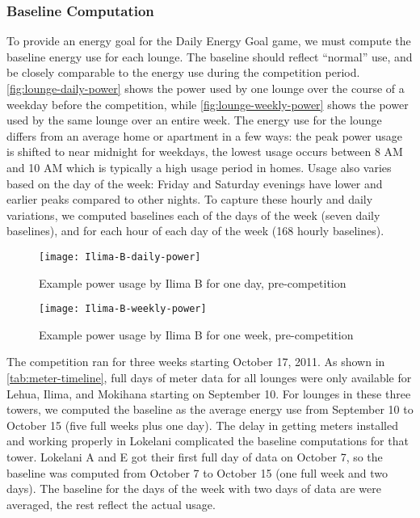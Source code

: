 \subsubsection{Baseline Computation}
\label{sec:baseline-computation}

To provide an energy goal for the Daily Energy Goal game, we must compute the  baseline energy use for each lounge. The baseline should reflect ``normal'' use, and be closely comparable to the energy use during the competition period. \autoref{fig:lounge-daily-power} shows the power used by one lounge over the course of a weekday before the competition, while \autoref{fig:lounge-weekly-power} shows the power used by the same lounge over an entire week. The energy use for the lounge differs from an average home or apartment in a few ways: the peak power usage is shifted to near midnight for weekdays, the lowest usage occurs between 8 AM and 10 AM which is typically a high usage period in homes. Usage also varies based on the day of the week: Friday and Saturday evenings have lower and earlier peaks compared to other nights. To capture these hourly and daily variations, we computed baselines each of the days of the week (seven daily baselines), and for each hour of each day of the week (168 hourly baselines).

\begin{figure}[htbp]
	\centering
		\texttt{[image: Ilima-B-daily-power]}
		\caption{Example power usage by Ilima B for one day, pre-competition}
\label{fig:lounge-daily-power}
\end{figure}

\begin{figure}[htbp]
	\centering
		\texttt{[image: Ilima-B-weekly-power]}
		\caption{Example power usage by Ilima B for one week, pre-competition}
\label{fig:lounge-weekly-power}
\end{figure}

The competition ran for three weeks starting October 17, 2011. As shown in \autoref{tab:meter-timeline}, full days of meter data for all lounges were only available for Lehua, Ilima, and Mokihana starting on September 10. For lounges in these three towers, we computed the baseline as the average energy use from September 10 to October 15 (five full weeks plus one day). The delay in getting meters installed and working properly in Lokelani complicated the baseline computations for that tower. Lokelani A and E got their first full day of data on October 7, so the baseline was computed from October 7 to October 15 (one full week and two days). The baseline for the days of the week with two days of data are were averaged, the rest reflect the actual usage.

